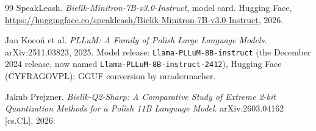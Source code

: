 \documentclass[11pt]{article}
\begin{document}
\begin{thebibliography}{99}
SpeakLeash.
\newblock \emph{Bielik-Minitron-7B-v3.0-Instruct}, model card.
\newblock Hugging Face, \url{https://huggingface.co/speakleash/Bielik-Minitron-7B-v3.0-Instruct}, 2026.

Jan Kocoń et al.
\newblock \emph{PLLuM: A Family of Polish Large Language Models}.
\newblock arXiv:2511.03823, 2025.
\newblock Model release: \texttt{Llama-PLLuM-8B-instruct} (the December 2024 release, now named \texttt{Llama-PLLuM-8B-instruct-2412}), Hugging Face (CYFRAGOVPL); GGUF conversion by mradermacher.

Jakub Prejzner.
\newblock \emph{Bielik-Q2-Sharp: A Comparative Study of Extreme 2-bit Quantization Methods for a Polish 11B Language Model}.
\newblock arXiv:2603.04162 [cs.CL], 2026.

\end{thebibliography}
\end{document}
